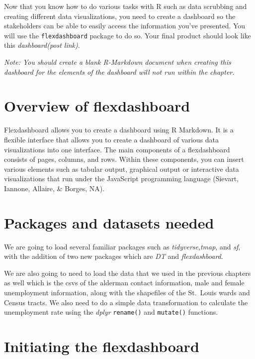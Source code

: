 \documentclass[
  krantz2]{krantz}
\begin{document}
Now that you know how to do various tasks with R such as data scrubbing and creating different data visualizations, you need to create a dashboard so the stakeholders can be able to easily access the information you've presented. You will use the \texttt{flexdashboard} package to do so. Your final product should look like this \emph{dashboard(post link)}.

\emph{Note: You should create a blank R-Markdown document when creating this dashboard for the elements of the dashboard will not run within the chapter.}

\hypertarget{flexdashboard-intro}{%
\section{Overview of flexdashboard}\label{flexdashboard-intro}}

Flexdashboard allows you to create a dashboard using R Markdown. It is a flexible interface that allows you to create a dashboard of various data visualizations into one interface. The main components of a flexdashboard consists of pages, columns, and rows. Within these components, you can insert various elements such as tabular output, graphical output or interactive data visualizations that run under the JavaScript programming language (Sievart, Iannone, Allaire, \& Borges, NA).

\hypertarget{flexdashboard-pkgs}{%
\section{Packages and datasets needed}\label{flexdashboard-pkgs}}

We are going to load several familiar packages such as \emph{tidyverse},\emph{tmap}, and \emph{sf}, with the addition of two new packages which are \emph{DT} and \emph{flexdashboard}.

We are also going to need to load the data that we used in the previous chapters as well which is the csvs of the alderman contact information, male and female unemployment information, along with the shapefiles of the St.~Louis wards and Census tracts. We also need to do a simple data transformation to calculate the unemployment rate using the \emph{dplyr} \texttt{rename()} and \texttt{mutate()} functions.

\hypertarget{initiating-the-flexdashboard}{%
\section{Initiating the flexdashboard}\label{initiating-the-flexdashboard}}
\end{document}
